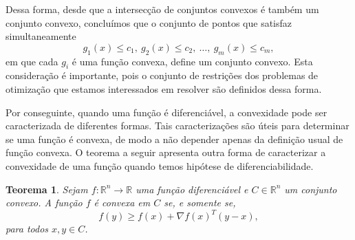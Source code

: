 \documentclass[12pt,a4paper]{scrartcl}
\def\RR{\mathds{R}}
\newtheorem{teo}{Teorema}
\theoremstyle{definition}%
\begin{document}
Dessa forma, desde que a intersecção de conjuntos convexos é também um conjunto convexo, concluímos que o conjunto de pontos que satisfaz simultaneamente
\[
g_{1}(x) \leq c_{1}, \ g_{2}(x) \leq c_{2}, \ \ldots, \ g_{m}(x) \leq c_{m} ,
\]
em que cada $g_{i}$ é uma função convexa, define um conjunto convexo. Esta consideração é importante, pois o conjunto de restrições dos problemas de otimização que estamos interessados em resolver são definidos dessa forma. 

Por conseguinte, quando uma função é diferenciável, a convexidade pode ser caracterizada de diferentes formas. Tais caracterizações são úteis para determinar se uma função é convexa, de modo a não depender apenas da definição usual de função convexa. O teorema a seguir apresenta outra forma de caracterizar a convexidade de uma função quando temos hipótese de diferenciabilidade.

\begin{teo}  \label{teo:diferenciabilidade_e_convexidade}
Sejam $f: \RR^{n} \rightarrow \RR $ uma função diferenciável e $C \in \RR^{n}$ um conjunto convexo. A função $f$ é convexa em $C$ se, e somente se, 
\[
f(y) \geq f(x) + \nabla f(x)^{T}(y-x),
\]
para todos $x, y \in C$.
\end{teo}
\end{document}
